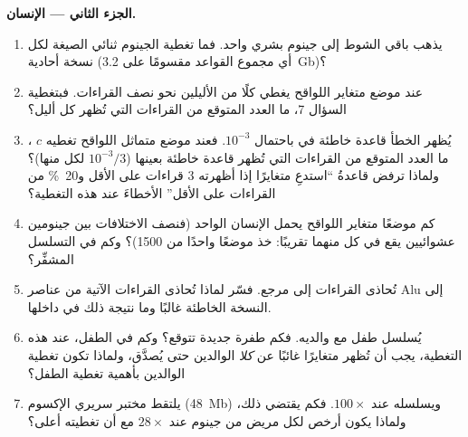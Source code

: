 \begin{problem}
\medskip
\noindent\textbf{الجزء الثاني --- الإنسان.}
\begin{enumerate}[resume]
  \item يذهب باقي الشوط إلى جينوم بشري واحد. فما تغطية
        الجينوم ثنائي الصيغة لكل نسخة أحادية (أي مجموع القواعد
        مقسومًا على \qty{3.2}{Gb})؟
  \item عند موضع متغاير اللواقح يغطي كلًا من الأليلين
        نحو نصف القراءات. فبتغطية السؤال 7، ما العدد
        المتوقع من القراءات التي تُظهر كل أليل؟
  \item يُظهر الخطأ قاعدة خاطئة في  باحتمال
        $10^{-3}$. فعند موضع متماثل اللواقح تغطيه $c$ ، ما
        العدد المتوقع من القراءات التي تُظهر قاعدة خاطئة بعينها
        ($10^{-3}/3$ لكل منها)؟ ولماذا ترفض قاعدةُ ``استدعِ متغايرًا
        إذا أظهرته $3$ قراءات على الأقل و\qty{20}{\%} من القراءات على
        الأقل'' الأخطاءَ عند هذه التغطية؟
  \item كم موضعًا متغاير اللواقح يحمل الإنسان الواحد (فنصف
        الاختلافات بين جينومين عشوائيين يقع في كل منهما تقريبًا:
        خذ موضعًا واحدًا من \num{1500})؟ وكم في التسلسل المشفِّر؟
  \item تُحاذى القراءات إلى مرجع. فسّر لماذا تُحاذى القراءات الآتية
        من عناصر Alu إلى النسخة الخاطئة غالبًا وما
        نتيجة ذلك في  داخلها.
  \item يُسلسل طفل مع والديه. فكم طفرة جديدة
        تتوقع؟ وكم  في الطفل، عند هذه التغطية،
        يجب أن تُظهر متغايرًا غائبًا عن \emph{كلا} الوالدين حتى
        يُصدَّق، ولماذا تكون تغطية الوالدين بأهمية تغطية
        الطفل؟
  \item يلتقط مختبر سريري الإكسوم (\qty{48}{Mb})
        ويسلسله عند $100\times$. فكم  يقتضي ذلك،
        ولماذا يكون أرخص لكل مريض من جينوم عند $28\times$
        مع أن تغطيته أعلى؟
\end{enumerate}


\end{problem}
